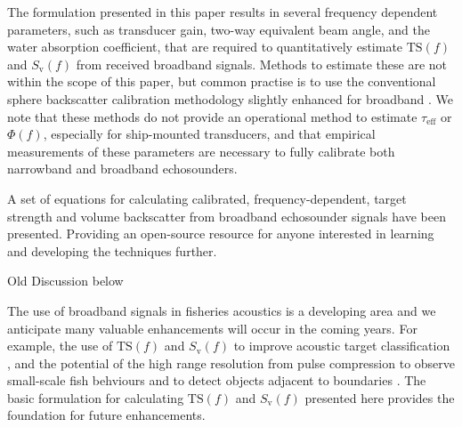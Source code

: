 \documentclass[preprint,12pt,TurnOnLineNumbers]{JASAnew}
\newcommand{\freqsym}{f}
\newcommand{\teff}{\tau_{\textrm{eff}}}
\newcommand{\ts}{\textrm{TS}}
\newcommand{\sv}{S_{\textrm{v}}}
\begin{document}
The formulation presented in this paper results in several frequency dependent parameters, such as transducer gain, two-way equivalent beam angle, and the water absorption coefficient, that are required to quantitatively estimate $\ts(\freqsym)$ and $\sv(\freqsym)$ from received broadband signals. Methods to estimate these are not within the scope of this paper, but common practise is to use the conventional sphere backscatter calibration methodology \citep{demerCalibrationAcousticInstruments2015} slightly enhanced for broadband \citep{hobaekCharacterizationTargetSpheres2013,lavery2017}. We note that these methods do not provide an operational method to estimate $\teff$ or $\Phi(f)$, especially for ship-mounted transducers, and that empirical measurements of these parameters are necessary to fully calibrate both narrowband and broadband echosounders.

A set of equations for calculating calibrated, frequency-dependent, target strength and volume backscatter from broadband echosounder signals have been presented. Providing an open-source resource for anyone interested in learning and developing the techniques further.  

Old Discussion below

The use of broadband signals in fisheries acoustics is a developing area and we anticipate many valuable enhancements will occur in the coming years. For example, the use of $\ts(\freqsym)$ and $\sv(\freqsym)$ to improve acoustic target classification \citep{bassett_broadband_2018, korneliussen2018}, and the potential of the high range resolution from pulse compression to observe small-scale fish behviours \citep{skaret_diel_2020} and to detect objects adjacent to boundaries \citep{lavery2017}. The basic formulation for calculating $\ts(\freqsym)$ and $\sv(\freqsym)$ presented here provides the foundation for future enhancements.
\end{document}

